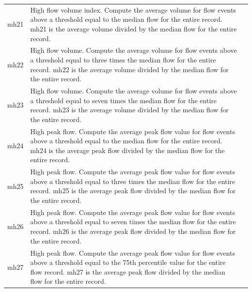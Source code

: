 \documentclass[a4paper,11pt]{article}\usepackage[]{graphicx}\usepackage[]{color}
\begin{document}
\begin{table}[ht]
\begin{threeparttable}[b]
\begin{tabularx}{\textwidth}{lXl}
  mh21 & High flow volume index. Compute the average volume for flow events above a threshold equal to the median flow for the entire record. mh21 is the average volume divided by the median flow for the entire record. \\
  mh22 & High flow volume. Compute the average volume for flow events above a threshold equal to three times the median flow for the entire record. mh22 is the average volume divided by the median flow for the entire record. \\
  mh23 & High flow volume. Compute the average volume for flow events above a threshold equal to seven times the median flow for the entire record. mh23 is the average volume divided by the median flow for the entire record. \\
  mh24 & High peak flow. Compute the average peak flow value for flow events above a threshold equal to the median flow for the entire record. mh24 is the average peak flow divided by the median flow for the entire record. \\
  mh25 & High peak flow. Compute the average peak flow value for flow events above a threshold equal to three times the median flow for the entire record. mh25 is the average peak flow divided by the median flow for the entire record. \\
  mh26 & High peak flow. Compute the average peak flow value for flow events above a threshold equal to seven times the median flow for the entire record. mh26 is the average peak flow divided by the median flow for the entire record. \\
  mh27 & High peak flow. Compute the average peak flow value for flow events above a threshold equal to the 75th percentile value for the entire flow record. mh27 is the average peak flow divided by the median flow for the entire record. \\
   \hline
  \end{tabularx}
  \end{threeparttable}
\end{table}
\end{document}
